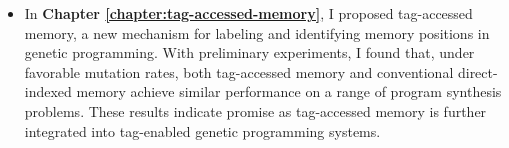 \begin{itemize}
    \item In \textbf{Chapter \ref{chapter:tag-accessed-memory}}, I proposed tag-accessed memory, a new mechanism for labeling and identifying memory positions in genetic programming.  
    With preliminary experiments, I found that, under favorable mutation rates, both tag-accessed memory and conventional direct-indexed memory achieve similar performance on a range of program synthesis problems.
    These results indicate promise as tag-accessed memory is further integrated into tag-enabled genetic programming systems.
    
\end{itemize}